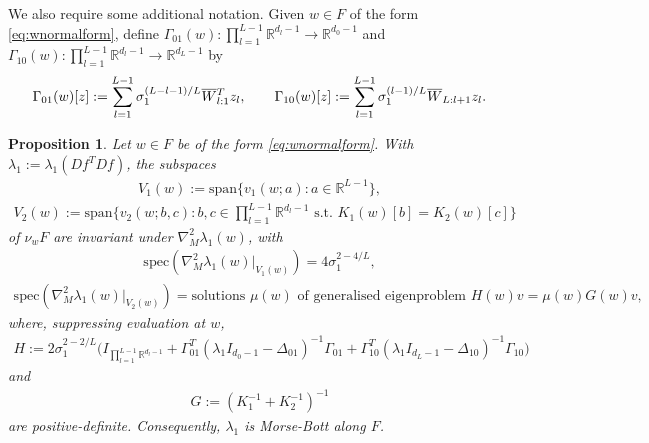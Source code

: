 \documentclass{article}
\newcommand{\RB}{\mathbb{R}}
\newcommand{\bW}{\smash{\overline{W}}\vphantom{W}}
\theoremstyle{plain}
\newtheorem{proposition}[theorem]{Proposition}
\theoremstyle{definition}
\theoremstyle{remark}
\begin{document}
We also require some additional notation. Given $w\in F$ of the form \eqref{eq:wnormalform}, define $\Gamma_{01}(w):\prod_{l=1}^{L-1}\RB^{d_l-1}\rightarrow\RB^{d_0-1}$ and $\Gamma_{10}(w):\prod_{l=1}^{L-1}\RB^{d_l-1}\rightarrow\RB^{d_L-1}$ by
\begin{align}
\Gamma_{01}(w)[z]:=\sum_{l=1}^{L-1}\sigma_1^{(L-l-1)/L}\bW_{l:1}^Tz_l,\qquad \Gamma_{10}(w)[z]:=\sum_{l=1}^{L-1}\sigma_1^{(l-1)/L}\bW_{L:l+1}z_l.
\end{align}

\begin{proposition}\label{prop:morsebott}
    Let $w\in F$ be of the form \eqref{eq:wnormalform}. With $\lambda_1:=\lambda_1(Df^TDf)$, the subspaces
    \begin{align}
    V_1(w):=\mathrm{span}\bigg\{v_1(w;a):a\in\RB^{L-1}\bigg\},
    \end{align}
    \begin{align}
    V_2(w):=\mathrm{span}\bigg\{v_2(w;b,c):b,c\in\prod_{l=1}^{L-1}\RB^{d_l-1}\text{ s.t. }K_1(w)[b] = K_2(w)[c]\bigg\}
    \end{align}
    of $\nu_wF$ are invariant under $\nabla^2_M\lambda_1(w)$, with
    \begin{align}
    \mathrm{spec}(\nabla^2_M\lambda_1(w)|_{V_1(w)}) = 4\sigma_1^{2-4/L},
    \end{align}
    \begin{align}
    \mathrm{spec}(\nabla^2_M\lambda_1(w)|_{V_2(w)}) = \text{solutions $\mu(w)$ of generalised eigenproblem }H(w)v = \mu(w) G(w)v,
    \end{align}
    where, suppressing evaluation at $w$,
    \begin{align}
    H:=2\sigma_1^{2-2/L}\big(I_{\prod_{l=1}^{L-1}\RB^{d_l-1}} + \Gamma_{01}^T(\lambda_1I_{d_0-1}-\Delta_{01})^{-1}\Gamma_{01} + \Gamma_{10}^T(\lambda_1I_{d_L-1}-\Delta_{10})^{-1}\Gamma_{10}\big)
    \end{align}
    and
    \begin{align}
    G:=(K_1^{-1}+K_2^{-1})^{-1}
    \end{align}
    are positive-definite. Consequently, $\lambda_1$ is Morse-Bott along $F$.
\end{proposition}
\end{document}
